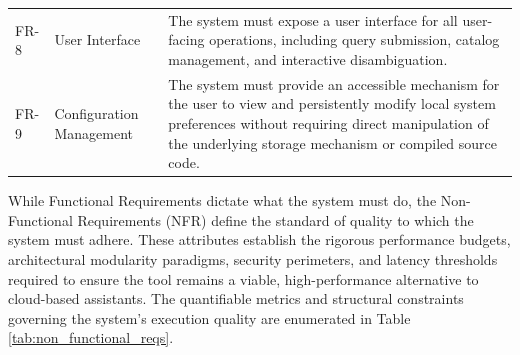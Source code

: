 \begin{table}[htbp]
\begin{tabularx}{\textwidth}{@{} l l X @{}}
        FR-8 & User Interface & The system must expose a user interface for all user-facing operations, including query submission, catalog management, and interactive disambiguation. \\
        FR-9 & Configuration Management & The system must provide an accessible mechanism for the user to view and persistently modify local system preferences without requiring direct manipulation of the underlying storage mechanism or compiled source code. \\
        \bottomrule
    \end{tabularx}
\end{table}
\FloatBarrier

While Functional Requirements dictate what the system must do, the Non-Functional Requirements (NFR) define the standard of quality to which the system must adhere. These attributes establish the rigorous performance budgets, architectural modularity paradigms, security perimeters, and latency thresholds required to ensure the tool remains a viable, high-performance alternative to cloud-based assistants. The quantifiable metrics and structural constraints governing the system's execution quality are enumerated in Table \ref{tab:non_functional_reqs}.

